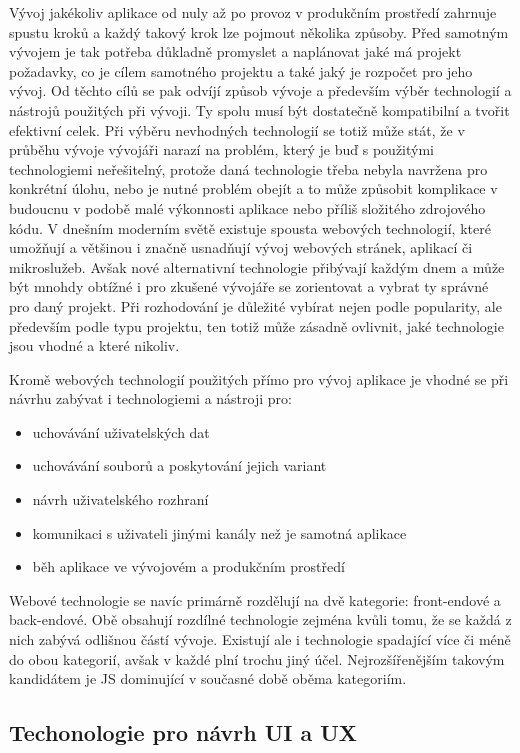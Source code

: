 \begin{itemize}
\begin{itemize}
Vývoj jakékoliv aplikace od nuly až po provoz v produkčním prostředí zahrnuje spustu kroků a každý takový krok
lze pojmout několika způsoby.
Před samotným vývojem je tak potřeba důkladně promyslet a naplánovat jaké má projekt požadavky, co je cílem samotného projektu
a také jaký je rozpočet pro jeho vývoj.
Od těchto cílů se pak odvíjí způsob vývoje a především výběr technologií a nástrojů použitých při vývoji.
Ty spolu musí být dostatečně kompatibilní a tvořit efektivní celek.
Při výběru nevhodných technologií se totiž může stát, že v průběhu vývoje vývojáři narazí na problém, který je buď
s použitými technologiemi neřešitelný, protože daná technologie třeba nebyla navržena pro konkrétní úlohu, nebo
je nutné problém obejít a to může způsobit komplikace v budoucnu v podobě malé výkonnosti aplikace nebo příliš
složitého zdrojového kódu.
V dnešním moderním světě existuje spousta webových technologií, které umožňují a většinou i značně usnadňují vývoj
webových stránek, aplikací či mikroslužeb.
Avšak nové alternativní technologie přibývají každým dnem a může být mnohdy obtížné i pro zkušené
vývojáře se zorientovat a vybrat ty správné pro daný projekt.
Při rozhodování je důležité vybírat nejen podle popularity, ale především podle typu projektu, ten totiž může zásadně
ovlivnit, jaké technologie jsou vhodné a které nikoliv.

Kromě webových technologií použitých přímo pro vývoj aplikace je vhodné se při návrhu zabývat i technologiemi a nástroji
pro:
\begin{itemize}
	\item uchovávání uživatelských dat
	\item uchovávání souborů a poskytování jejich variant
	\item návrh uživatelského rozhraní
	\item komunikaci s uživateli jinými kanály než je samotná aplikace
	\item běh aplikace ve vývojovém a produkčním prostředí
\end{itemize}

Webové technologie se navíc primárně rozdělují na dvě kategorie: front-endové a back-endové.
Obě obsahují rozdílné technologie zejména kvůli tomu, že se každá z nich zabývá odlišnou částí
vývoje.
Existují ale i technologie spadající více či méně do obou kategorií, avšak v každé plní trochu jiný účel.
Nejrozšířenějším takovým kandidátem je \noindent\ac{JS} dominující v současné době oběma kategoriím.

	\subsection{Techonologie pro návrh UI a UX}


\end{itemize}
\end{itemize}
